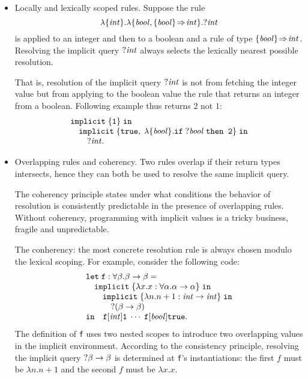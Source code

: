 \begin{itemize}
\item Locally and lexically scoped rules. Suppose the rule 
\[
\qlam{\tyInt}
 {\qlam{\tyBool, \rulety{\tyBool}{\tyInt}}
       {\qask{\tyInt}}
 }
\]
is applied to an integer and then to a boolean and a rule
of type $\{{\it bool\/}\}\!\Rightarrow\!{\it int\/}$. Resolving the implicit query
${\it ?\/}{\it int\/}$ always selects the lexically nearest possible
resolution.

That is, resolution of the implicit query ${\it ?\/}{\it int\/}$ is not from
fetching the integer value but from applying to the boolean value the
rule that returns an integer from a boolean. Following example thus
returns $2$ not $1$:
\[
\begin{array}{l}
\texttt{implicit}\;\{\texttt{1}\}\;\texttt{in}\\
\mbox{\ \ \ }\texttt{implicit}\;\{\texttt{true},\;
\lambda\{{\it bool\/}\}.\texttt{if}\;{\it ?\/}{\it bool\/}\;\texttt{then 2}\}\;\texttt{in}\\
\mbox{\ \ \ \ \ \ }{\it ?\/}{\it int\/}.
\end{array}
\]

\item Overlapping rules and coherency. Two rules overlap if their
  return types intersects, hence they can both be used 
  to resolve the same implicit query. 

  The coherency principle states
  under what conditions the behavior of resolution is consistently
  predictable in the presence of overlapping rules. 
  Without coherency, programming with implicit values is a tricky
  business, fragile and unpredictable. 

  The conherency: the most concrete resolution rule is
  always chosen modulo the lexical scoping. For example, consider the
  following code: 
\[
\begin{array}{l}
\texttt{let}\;\texttt{f}:\forall\beta.\beta\to\beta = \\
\mbox{\ \ \ }\texttt{implicit}\;
  \{\lambda x.x:\forall\alpha.\alpha\to\alpha\}\;\texttt{in}\\
\mbox{\ \ \ \ \ \ }\texttt{implicit}\;
   \{\lambda n.n+1:{\it int\/}\to{\it int\/}\}\;\texttt{in}\\
\mbox{\ \ \ \ \ \ \ \ \ }{\it ?\/}(\beta\to\beta)\\
\texttt{in}
\mbox{\ \ \ }\texttt{f} [{\it int\/}] \texttt{1}\;\cdots\;
             \texttt{f} [{\it bool\/}] \texttt{true}.
\end{array}
\]
The definition of \texttt{f} uses two nested scopes to introduce two
overlapping values in the implicit environment.
According to the consistency principle, resolving the 
implicit query ${\it ?\/}\beta\to\beta$ is determined at \texttt{f}'s
instantiations: the first $f$ must be $\lambda
n.n+1$ and the second $f$ must be $\lambda x.x$. 
\end{itemize}

